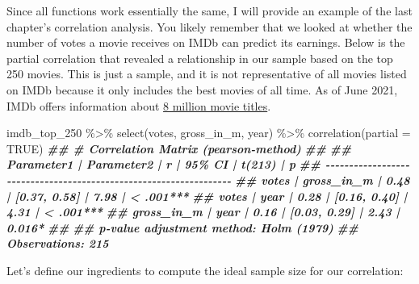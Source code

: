 \documentclass[
]{book}
\newenvironment{Shaded}{\begin{snugshade}}{\end{snugshade}}
\newcommand{\AttributeTok}[1]{\textcolor[rgb]{0.77,0.63,0.00}{#1}}
\newcommand{\ConstantTok}[1]{\textcolor[rgb]{0.00,0.00,0.00}{#1}}
\newcommand{\DocumentationTok}[1]{\textcolor[rgb]{0.56,0.35,0.01}{\textbf{\textit{#1}}}}
\newcommand{\FunctionTok}[1]{\textcolor[rgb]{0.00,0.00,0.00}{#1}}
\newcommand{\NormalTok}[1]{#1}
\newcommand{\SpecialCharTok}[1]{\textcolor[rgb]{0.00,0.00,0.00}{#1}}
\begin{document}
Since all functions work essentially the same, I will provide an example of the last chapter's correlation analysis. You likely remember that we looked at whether the number of votes a movie receives on IMDb can predict its earnings. Below is the partial correlation that revealed a relationship in our sample based on the top 250 movies. This is just a sample, and it is not representative of all movies listed on IMDb because it only includes the best movies of all time. As of June 2021, IMDb offers information about \href{https://www.imdb.com/pressroom/stats/}{8 million movie titles}.

\begin{Shaded}
\begin{Highlighting}[]
\NormalTok{imdb\_top\_250 }\SpecialCharTok{\%\textgreater{}\%}
  \FunctionTok{select}\NormalTok{(votes, gross\_in\_m, year) }\SpecialCharTok{\%\textgreater{}\%}
  \FunctionTok{correlation}\NormalTok{(}\AttributeTok{partial =} \ConstantTok{TRUE}\NormalTok{)}
\DocumentationTok{\#\# \# Correlation Matrix (pearson{-}method)}
\DocumentationTok{\#\# }
\DocumentationTok{\#\# Parameter1 | Parameter2 |    r |       95\% CI | t(213) |         p}
\DocumentationTok{\#\# {-}{-}{-}{-}{-}{-}{-}{-}{-}{-}{-}{-}{-}{-}{-}{-}{-}{-}{-}{-}{-}{-}{-}{-}{-}{-}{-}{-}{-}{-}{-}{-}{-}{-}{-}{-}{-}{-}{-}{-}{-}{-}{-}{-}{-}{-}{-}{-}{-}{-}{-}{-}{-}{-}{-}{-}{-}{-}{-}{-}{-}{-}{-}{-}{-}{-}}
\DocumentationTok{\#\# votes      | gross\_in\_m | 0.48 | [0.37, 0.58] |   7.98 | \textless{} .001***}
\DocumentationTok{\#\# votes      |       year | 0.28 | [0.16, 0.40] |   4.31 | \textless{} .001***}
\DocumentationTok{\#\# gross\_in\_m |       year | 0.16 | [0.03, 0.29] |   2.43 | 0.016*   }
\DocumentationTok{\#\# }
\DocumentationTok{\#\# p{-}value adjustment method: Holm (1979)}
\DocumentationTok{\#\# Observations: 215}
\end{Highlighting}
\end{Shaded}

Let's define our ingredients to compute the ideal sample size for our correlation:
\end{document}
